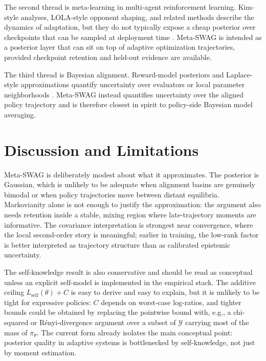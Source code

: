 \documentclass[10pt]{article}
\theoremstyle{plain}
\theoremstyle{definition}
\theoremstyle{remark}
\begin{document}
The second thread is meta-learning in multi-agent reinforcement learning. Kim-style analyses, LOLA-style opponent shaping, and related methods describe the dynamics of adaptation, but they do not typically expose a cheap posterior over checkpoints that can be sampled at deployment time \citep{kim2021meta,foerster2018lola,giannou2022convergence}. Meta-SWAG is intended as a posterior layer that can sit on top of adaptive optimization trajectories, provided checkpoint retention and held-out evidence are available.

The third thread is Bayesian alignment. Reward-model posteriors and Laplace-style approximations quantify uncertainty over evaluators or local parameter neighborhoods \citep{yang2024laplacelora,yang2024brm}. Meta-SWAG instead quantifies uncertainty over the aligned policy trajectory and is therefore closest in spirit to policy-side Bayesian model averaging.

\section{Discussion and Limitations}

Meta-SWAG is deliberately modest about what it approximates. The posterior is Gaussian, which is unlikely to be adequate when alignment basins are genuinely bimodal or when policy trajectories move between distant equilibria. Markovianity alone is not enough to justify the approximation: the argument also needs retention inside a stable, mixing region where late-trajectory moments are informative. The covariance interpretation is strongest near convergence, where the local second-order story is meaningful; earlier in training, the low-rank factor is better interpreted as trajectory structure than as calibrated epistemic uncertainty.

The self-knowledge result is also conservative and should be read as conceptual unless an explicit self-model is implemented in the empirical stack. The additive ceiling $L_{\mathrm{self}}(\theta)+C$ is easy to derive and easy to explain, but it is unlikely to be tight for expressive policies: $C$ depends on worst-case log-ratios, and tighter bounds could be obtained by replacing the pointwise bound with, e.g., a chi-squared or R\'enyi-divergence argument over a subset of $\mathcal{Y}$ carrying most of the mass of $\pi_\theta$. The current form already isolates the main conceptual point: posterior quality in adaptive systems is bottlenecked by self-knowledge, not just by moment estimation.
\end{document}
